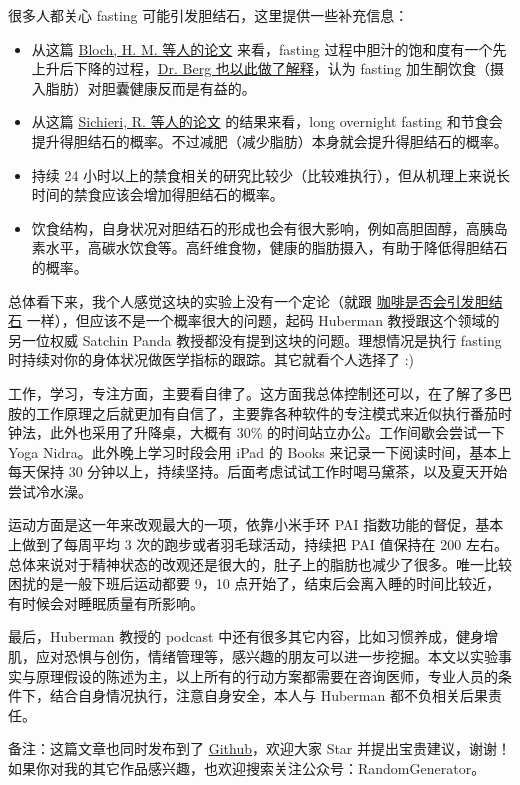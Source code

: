 \documentclass{report}
\begin{document}
很多人都关心 fasting 可能引发胆结石，这里提供一些补充信息：

\begin{itemize}
    \item 从这篇 \href{https://www.ncbi.nlm.nih.gov/pmc/articles/PMC1419405/}{Bloch, H. M. 等人的论文} 来看，fasting 过程中胆汁的饱和度有一个先上升后下降的过程，\href{https://youtu.be/2lGuXBwudKw}{Dr. Berg 也以此做了解释}，认为 fasting 加生酮饮食（摄入脂肪）对胆囊健康反而是有益的。
    \item 从这篇 \href{https://www.ncbi.nlm.nih.gov/pmc/articles/PMC1405175/}{Sichieri, R. 等人的论文} 的结果来看，long overnight fasting 和节食会提升得胆结石的概率。不过减肥（减少脂肪）本身就会提升得胆结石的概率。
    \item 持续 24 小时以上的禁食相关的研究比较少（比较难执行），但从机理上来说长时间的禁食应该会增加得胆结石的概率。
    \item 饮食结构，自身状况对胆结石的形成也会有很大影响，例如高胆固醇，高胰岛素水平，高碳水饮食等。高纤维食物，健康的脂肪摄入，有助于降低得胆结石的概率。
\end{itemize}

总体看下来，我个人感觉这块的实验上没有一个定论（就跟 \href{https://www.coffeeandhealth.org/factsheet/gallstones-factsheet}{咖啡是否会引发胆结石} 一样），但应该不是一个概率很大的问题，起码 Huberman 教授跟这个领域的另一位权威 Satchin Panda 教授都没有提到这块的问题。理想情况是执行 fasting 时持续对你的身体状况做医学指标的跟踪。其它就看个人选择了 :)

工作，学习，专注方面，主要看自律了。这方面我总体控制还可以，在了解了多巴胺的工作原理之后就更加有自信了，主要靠各种软件的专注模式来近似执行番茄时钟法，此外也采用了升降桌，大概有 30\% 的时间站立办公。工作间歇会尝试一下 Yoga Nidra。此外晚上学习时段会用 iPad 的 Books 来记录一下阅读时间，基本上每天保持 30 分钟以上，持续坚持。后面考虑试试工作时喝马黛茶，以及夏天开始尝试冷水澡。

运动方面是这一年来改观最大的一项，依靠小米手环 PAI 指数功能的督促，基本上做到了每周平均 3 次的跑步或者羽毛球活动，持续把 PAI 值保持在 200 左右。总体来说对于精神状态的改观还是很大的，肚子上的脂肪也减少了很多。唯一比较困扰的是一般下班后运动都要 9，10 点开始了，结束后会离入睡的时间比较近，有时候会对睡眠质量有所影响。

最后，Huberman 教授的 podcast 中还有很多其它内容，比如习惯养成，健身增肌，应对恐惧与创伤，情绪管理等，感兴趣的朋友可以进一步挖掘。本文以实验事实与原理假设的陈述为主，以上所有的行动方案都需要在咨询医师，专业人员的条件下，结合自身情况执行，注意自身安全，本人与 Huberman 都不负相关后果责任。

备注：这篇文章也同时发布到了 \href{https://github.com/zijie0/HumanSystemOptimization}{Github}，欢迎大家 Star 并提出宝贵建议，谢谢！如果你对我的其它作品感兴趣，也欢迎搜索关注公众号：RandomGenerator。
\end{document}
